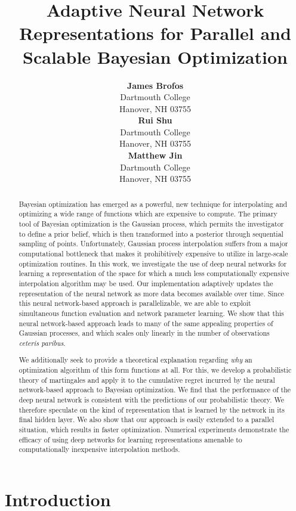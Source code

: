 \documentclass[]{article}
\title{Adaptive Neural Network Representations for Parallel and Scalable Bayesian Optimization}
\author{ {\bf James Brofos} \\
Dartmouth College\\
Hanover, NH 03755 \\
\And
{\bf Rui Shu} \\
Dartmouth College\\
Hanover, NH 03755 \\
\And
{\bf Matthew Jin} \\
Dartmouth College\\
Hanover, NH 03755 \\
}
\newcommand{\1}{\mathbf{1}}
\newcommand{\0}{\mathbf{0}}
\begin{document}
\maketitle

\begin{abstract}
	Bayesian optimization has emerged as a powerful, new technique for interpolating and optimizing a wide range of functions which are expensive to compute. The primary tool of Bayesian optimization is the Gaussian process, which permits the investigator to define a prior belief, which is then transformed into a posterior through sequential sampling of points. Unfortunately, Gaussian process interpolation suffers from a major computational bottleneck that makes it prohibitively expensive to utilize in large-scale optimization routines. In this work, we investigate the use of deep neural networks for learning a representation of the space for which a much less computationally expensive interpolation algorithm may be used. Our implementation adaptively updates the representation of the neural network as more data becomes available over time. Since this neural network-based approach is parallelizable, we are able to exploit simultaneous function evaluation and network parameter learning. We show that this neural network-based approach leads to many of the same appealing properties of Gaussian processes, and which scales only linearly in the number of observations \textit{ceteris paribus}.
    
    We additionally seek to provide a theoretical explanation regarding \textit{why} an optimization algorithm of this form functions at all. For this, we develop a probabilistic theory of martingales and apply it to the cumulative regret incurred by the neural network-based approach to Bayesian optimization. We find that the performance of the deep neural network is consistent with the predictions of our probabilistic theory. We therefore speculate on the kind of representation that is learned by the network in its final hidden layer. We also show that our approach is easily extended to a parallel situation, which results in faster optimization. Numerical experiments demonstrate the efficacy of using deep networks for learning representations amenable to computationally inexpensive interpolation methods.
\end{abstract}

\section{Introduction}
\end{document}

